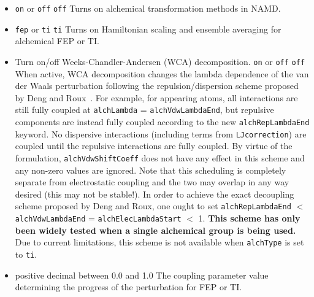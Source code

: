 \begin{itemize}
\item
{} {{\tt on} or {\tt off}} {{\tt off}} {Turns on alchemical transformation methods in NAMD.}

\item
{} {{\tt fep} or {\tt ti}} {{\tt ti}} 
{Turns on Hamiltonian scaling and ensemble averaging for alchemical FEP or TI.}

\item
{}
{Turn on/off Weeks-Chandler-Andersen (WCA) decomposition.}
{{\tt on} or {\tt off}}
{{\tt off}}
{
When active, WCA decomposition changes the lambda dependence of the van der
  Waals perturbation following the repulsion/dispersion scheme proposed by
  Deng and Roux~\cite{Deng2004}.
For example, for appearing atoms, all interactions are still fully coupled at
  {\tt alchLambda} = {\tt alchVdwLambdaEnd}, but repulsive components are
  instead fully coupled according to the new {\tt alchRepLambdaEnd} keyword.
No dispersive interactions (including terms from {\tt LJcorrection}) are
  coupled until the repulsive interactions are fully coupled.
By virtue of the formulation, {\tt alchVdwShiftCoeff} does not have any effect
  in this scheme and any non-zero values are ignored.
Note that this scheduling is completely separate from electrostatic coupling
  and the two may overlap in any way desired (this may not be stable!).
In order to achieve the exact decoupling scheme proposed by Deng and Roux,
  one ought to set {\tt alchRepLambdaEnd} $<$ {\tt alchVdwLambdaEnd} =
  {\tt alchElecLambdaStart} $<$ 1.
\textbf{
This scheme has only been widely tested when a single alchemical group is
  being used.
}
Due to current limitations, this scheme is not available when {\tt alchType}
  is set to {\tt ti}.
}

\item
{} {positive
decimal between 0.0 and 1.0} {The coupling parameter value determining the
progress of the perturbation for FEP or TI.}


\end{itemize}
